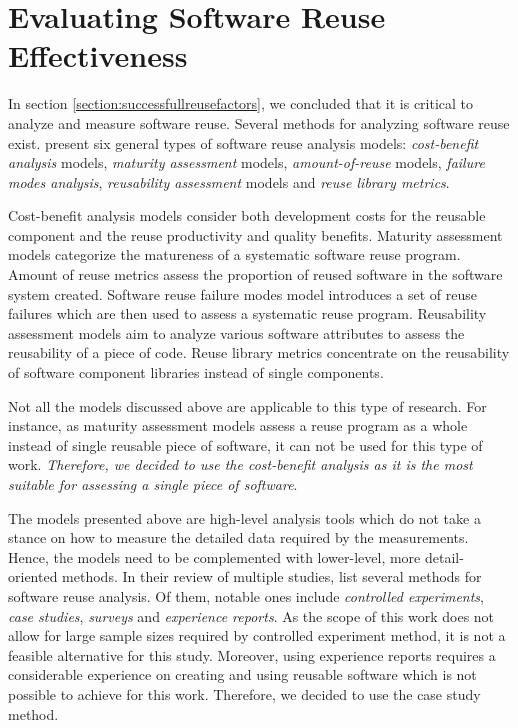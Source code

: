 \section{Evaluating Software Reuse Effectiveness}

In section \ref{section:successfullreusefactors}, we concluded that it is critical to analyze and measure software reuse. Several methods for analyzing software reuse exist. \citet{frakes_software_1996} present six general types of software reuse analysis models: \emph{cost-benefit analysis} models, \emph{maturity assessment} models, \emph{amount-of-reuse} models, \emph{failure modes analysis}, \emph{reusability assessment} models and \emph{reuse library metrics}. 

Cost-benefit analysis models consider both development costs for the reusable component and the reuse productivity and quality benefits. Maturity assessment models categorize the matureness of a systematic software reuse program. Amount of reuse metrics assess the proportion of reused software in the software system created. Software reuse failure modes model introduces a set of reuse failures which are then used to assess a systematic reuse program. Reusability assessment models aim to analyze various software attributes to assess the reusability of a piece of code. Reuse library metrics concentrate on the reusability of software component libraries instead of single components.

Not all the models discussed above are applicable to this type of research. For instance, as maturity assessment models assess a reuse program as a whole instead of single reusable piece of software, it can not be used for this type of work. \emph{Therefore, we decided to use the cost-benefit analysis as it is the most suitable for assessing a single piece of software}.

The models presented above are high-level analysis tools which do not take a stance on how to measure the detailed data required by the measurements. Hence, the models need to be complemented with lower-level, more detail-oriented methods. In their review of multiple studies, \citet{mohagheghi_quality_2007} list several methods for software reuse analysis. Of them, notable ones include \emph{controlled experiments}, \emph{case studies}, \emph{surveys} and \emph{experience reports}. As the scope of this work does not allow for large sample sizes required by controlled experiment method, it is not a feasible alternative for this study. Moreover, using experience reports requires a considerable experience on creating and using reusable software which is not possible to achieve for this work. Therefore, we decided to use the case study method.

